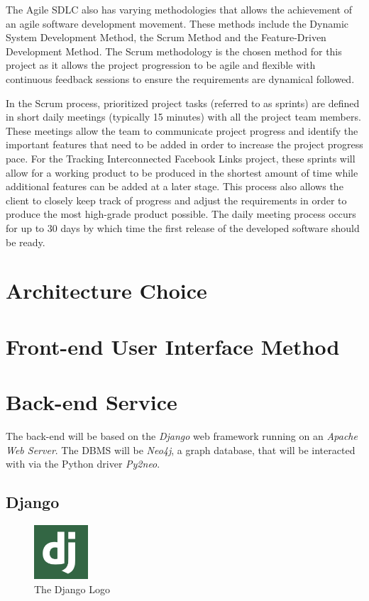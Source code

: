 \documentclass[10pt,onecolumn]{article}
\begin{document}
The Agile SDLC also has varying methodologies that allows the achievement of an agile software development movement. These methods include the Dynamic System Development Method, the Scrum Method and the Feature-Driven Development Method. The Scrum methodology is the chosen method for this project as it allows the project progression to be agile and flexible with continuous feedback sessions to ensure the requirements are dynamical followed\cite{Kinsey}.

In the Scrum process, prioritized project tasks (referred to as sprints) are defined in short daily meetings (typically 15 minutes) with all the project team members. These meetings allow the team to communicate project progress and identify the important features that need to be added in order to increase the project progress pace. For the Tracking Interconnected Facebook Links project, these sprints will allow for a working product to be produced in the shortest amount of time while additional features can be  added at a later stage. This process also allows the client to closely keep track of progress and adjust the requirements in order to produce the most high-grade product possible. The daily meeting process occurs for up to 30 days by which time the first release of the developed software should be ready.   


\section{Architecture Choice}


\section{Front-end User Interface Method}


\section{Back-end Service}

The back-end will be based on the \emph{Django} web framework running on an \emph{Apache Web Server}. The DBMS will be \emph{Neo4j}, a graph database, that will be interacted with via the Python driver \emph{Py2neo}. 
\subsection{Django}
\begin{figure}
  \begin{center}
    \includegraphics[width=0.18\textwidth]{django}
  \end{center}
  \caption{The Django Logo}
\end{figure}
\end{document}

